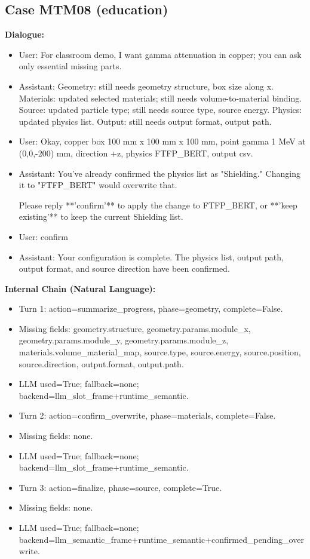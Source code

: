 \documentclass[11pt]{ctexart}
\begin{document}
\subsection{Case MTM08 (education)}
\textbf{Dialogue:}
\begin{itemize}
\item User: For classroom demo, I want gamma attenuation in copper; you can ask only essential missing parts.
\item Assistant: Geometry: still needs geometry structure, box size along x. Materials: updated selected materials; still needs volume-to-material binding. Source: updated particle type; still needs source type, source energy. Physics: updated physics list. Output: still needs output format, output path.
\item User: Okay, copper box 100 mm x 100 mm x 100 mm, point gamma 1 MeV at (0,0,-200) mm, direction +z, physics FTFP\_BERT, output csv.
\item Assistant: You've already confirmed the physics list as "Shielding." Changing it to "FTFP\_BERT" would overwrite that.

Please reply **'confirm'** to apply the change to FTFP\_BERT, or **'keep existing'** to keep the current Shielding list.
\item User: confirm
\item Assistant: Your configuration is complete. The physics list, output path, output format, and source direction have been confirmed.
\end{itemize}
\textbf{Internal Chain (Natural Language):}
\begin{itemize}
\item Turn 1: action=summarize\_progress, phase=geometry, complete=False.
\item Missing fields: geometry.structure, geometry.params.module\_x, geometry.params.module\_y, geometry.params.module\_z, materials.volume\_material\_map, source.type, source.energy, source.position, source.direction, output.format, output.path.
\item LLM used=True; fallback=none; backend=llm\_slot\_frame+runtime\_semantic.
\item Turn 2: action=confirm\_overwrite, phase=materials, complete=False.
\item Missing fields: none.
\item LLM used=True; fallback=none; backend=llm\_slot\_frame+runtime\_semantic.
\item Turn 3: action=finalize, phase=source, complete=True.
\item Missing fields: none.
\item LLM used=True; fallback=none; backend=llm\_semantic\_frame+runtime\_semantic+confirmed\_pending\_overwrite.
\end{itemize}
\end{document}
